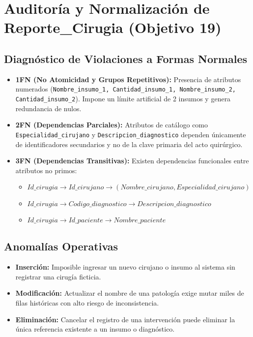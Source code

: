 \documentclass[11pt,a4paper]{article}
\begin{document}
\newpage

\section{Auditoría y Normalización de Reporte\_Cirugia (Objetivo 19)}

\subsection{Diagnóstico de Violaciones a Formas Normales}
\begin{itemize}
	\item \textbf{1FN (No Atomicidad y Grupos Repetitivos):} Presencia de atributos numerados (\texttt{Nombre\_insumo\_1, Cantidad\_insumo\_1, Nombre\_insumo\_2, Cantidad\_insumo\_2}). Impone un límite artificial de 2 insumos y genera redundancia de nulos.
	\item \textbf{2FN (Dependencias Parciales):} Atributos de catálogo como \texttt{Especialidad\_cirujano} y \texttt{Descripcion\_diagnostico} dependen únicamente de identificadores secundarios y no de la clave primaria del acto quirúrgico.
	\item \textbf{3FN (Dependencias Transitivas):} Existen dependencias funcionales entre atributos no primos:
	\begin{itemize}
		\item $Id\_cirugia \to Id\_cirujano \to (Nombre\_cirujano, Especialidad\_cirujano)$
		\item $Id\_cirugia \to Codigo\_diagnostico \to Descripcion\_diagnostico$
		\item $Id\_cirugia \to Id\_paciente \to Nombre\_paciente$
	\end{itemize}
\end{itemize}

\subsection{Anomalías Operativas}
\begin{itemize}
	\item \textbf{Inserción:} Imposible ingresar un nuevo cirujano o insumo al sistema sin registrar una cirugía ficticia.
	\item \textbf{Modificación:} Actualizar el nombre de una patología exige mutar miles de filas históricas con alto riesgo de inconsistencia.
	\item \textbf{Eliminación:} Cancelar el registro de una intervención puede eliminar la única referencia existente a un insumo o diagnóstico.
\end{itemize}
\end{document}
